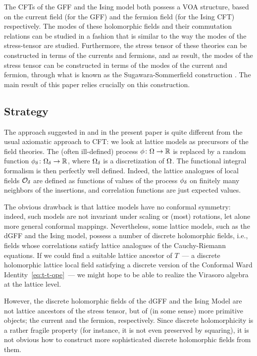 \documentclass[12pt,oneside,english]{amsart}
\numberwithin{equation}{section}
\numberwithin{figure}{section}
\theoremstyle{plain}
\theoremstyle{plain}
\theoremstyle{plain}
\theoremstyle{plain}
\theoremstyle{remark}
\theoremstyle{definition}
\theoremstyle{plain}
\theoremstyle{plain}
\numberwithin{thm}{section}
\begin{document}
The CFTs of the GFF and the Ising model both possess a VOA structure,
based on the current field (for the GFF) and the fermion field (for
the Ising CFT) respectively. The modes of these holomorphic fields
and their commutation relations can be studied in a fashion that is
similar to the way the modes of the stress-tensor are studied. Furthermore,
the stress tensor of these theories can be constructed in terms of
the currents and fermions, and as result, the modes of the stress
tensor can be constructed in terms of the modes of the current and
fermion, through what is known as the Sugawara-Sommerfield construction
\cite{sugawara,sommerfield}. The main result of this paper relies
crucially on this construction.

\subsection{\label{subsec:strategy}Strategy}

The approach suggested in \cite{gheissari-hongler-park} and in the
present paper is quite different from the usual axiomatic approach
to CFT: we look at lattice models as precursors of the field theories.
The (often ill-defined) process ${\phi} \colon {\Omega}  \to  \mathbb{R}$
is replaced by
a random function ${\phi}_{{\delta}} \colon {{\Omega}}_{{\delta}} \to  \mathbb{R}$,
where ${{\Omega}}_{{\delta}}$ is a discretization of ${\Omega} $. The functional
integral formalism is then perfectly well defined. Indeed, the lattice
analogues of local fields ${\mathcal{O}}_{{\delta}}$ are defined as functions
of values of the process ${\phi}_{{\delta}}$ on finitely many neighbors
of the insertions, and correlation functions are just expected values.

The obvious drawback is that lattice models have no conformal symmetry:
indeed, such models are not invariant under scaling or (most)
rotations, let alone more general conformal mappings. Nevertheless,
some lattice models, such as the dGFF and the Ising model, possess
a number of discrete holomorphic fields, i.e., fields whose correlations
satisfy lattice analogues of the Cauchy-Riemann equations. If we could
find a suitable lattice ancestor of $T$~--- a discrete
holomorphic lattice local field satisfying a discrete version of the
Conformal Ward Identity~\eqref{eq:t-t-ope}~--- we might
hope to be able to realize the Virasoro algebra at the lattice level.

However, the discrete holomorphic fields of the dGFF and the Ising
Model are not lattice ancestors of the stress tensor, but of (in some
sense) more primitive objects; the current and the fermion, respectively.
Since discrete holomorphicity is a rather fragile property (for instance,
it is not even preserved by squaring), it is not obvious how to construct
more sophisticated discrete holomorphic fields from them.
\end{document}
